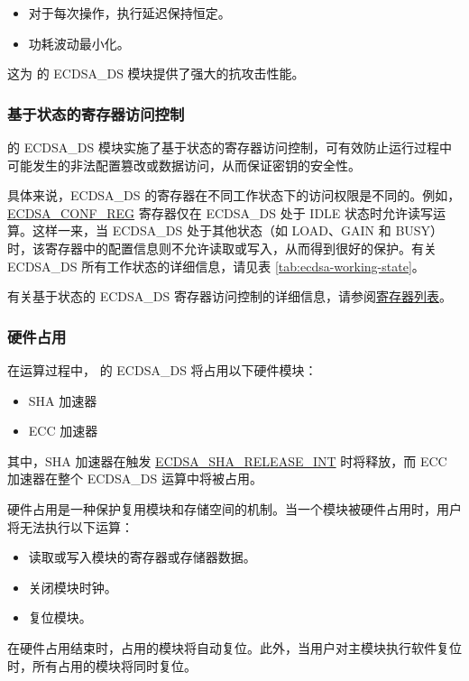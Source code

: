\documentclass[main\_\_CN.tex]{subfiles}
\begin{document}
\begin{itemize}
    \item 对于每次操作，执行延迟保持恒定。
    \item 功耗波动最小化。
\end{itemize}

这为 \chipseries{} 的 ECDSA\_DS 模块提供了强大的抗攻击性能。

\subsubsection{基于状态的寄存器访问控制}

\chipseries{} 的 ECDSA\_DS 模块实施了基于状态的寄存器访问控制，可有效防止运行过程中可能发生的非法配置篡改或数据访问，从而保证密钥的安全性。

具体来说，ECDSA\_DS 的寄存器在不同工作状态下的访问权限是不同的。例如，\hyperref[regdesc:ECDSACONFREG]{ECDSA\_CONF\_REG} 寄存器仅在 ECDSA\_DS 处于 IDLE 状态时允许读写运算。这样一来，当 ECDSA\_DS 处于其他状态（如 LOAD、GAIN 和 BUSY）时，该寄存器中的配置信息则不允许读取或写入，从而得到很好的保护。有关 ECDSA\_DS 所有工作状态的详细信息，请见表 \ref{tab:ecdsa-working-state}。

有关基于状态的 ECDSA\_DS 寄存器访问控制的详细信息，请参阅\hyperref[sec:ecdsa-reg-summ]{寄存器列表}。

\subsubsection{硬件占用}

在运算过程中，\chipname{} 的 ECDSA\_DS 将占用以下硬件模块：
\begin{itemize}
    \item SHA 加速器
    \item ECC 加速器
\end{itemize}

其中，SHA 加速器在触发 \hyperref[int:ECDSASHARELEASEINT]{ECDSA\_SHA\_RELEASE\_INT} 时将释放，而 ECC 加速器在整个 ECDSA\_DS 运算中将被占用。

\begin{tiplisting}
硬件占用是一种保护复用模块和存储空间的机制。当一个模块被硬件占用时，用户将无法执行以下运算：
\vspace{-0.5em}
\begin{itemize}
    \item 读取或写入模块的寄存器或存储器数据。
    \item 关闭模块时钟。
    \item 复位模块。
\end{itemize}
\vspace{-0.5em}
在硬件占用结束时，占用的模块将自动复位。此外，当用户对主模块执行软件复位时，所有占用的模块将同时复位。
\end{tiplisting}
\end{document}

